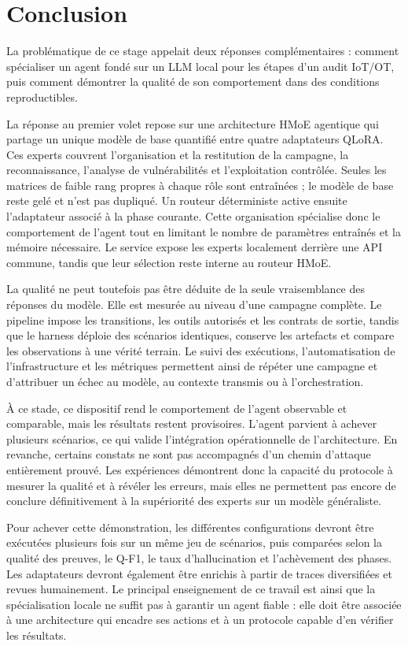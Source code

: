 \chapter{Conclusion}
\label{chap:conclusion}

La problématique de ce stage appelait deux réponses complémentaires : comment
spécialiser un agent fondé sur un LLM local pour les étapes d'un audit IoT/OT,
puis comment démontrer la qualité de son comportement dans des conditions
reproductibles.

La réponse au premier volet repose sur une architecture HMoE agentique qui
partage un unique modèle de base quantifié entre quatre adaptateurs QLoRA. Ces
experts couvrent l'organisation et la restitution de la campagne, la
reconnaissance, l'analyse de vulnérabilités et l'exploitation contrôlée. Seules
les matrices de faible rang propres à chaque rôle sont entraînées ; le modèle de
base reste gelé et n'est pas dupliqué. Un routeur déterministe active ensuite
l'adaptateur associé à la phase courante. Cette organisation spécialise donc le
comportement de l'agent tout en limitant le nombre de paramètres entraînés et la
mémoire nécessaire. Le service expose les experts localement derrière une API
commune, tandis que leur sélection reste interne au routeur HMoE.

La qualité ne peut toutefois pas être déduite de la seule vraisemblance des
réponses du modèle. Elle est mesurée au niveau d'une campagne complète. Le
pipeline impose les transitions, les outils autorisés et les contrats de sortie,
tandis que le harness déploie des scénarios identiques, conserve les artefacts et
compare les observations à une vérité terrain. Le suivi des exécutions,
l'automatisation de l'infrastructure et les métriques permettent ainsi de répéter
une campagne et d'attribuer un échec au modèle, au contexte transmis ou à
l'orchestration.

À ce stade, ce dispositif rend le comportement de l'agent observable et
comparable, mais les résultats restent provisoires. L'agent parvient à achever
plusieurs scénarios, ce qui valide l'intégration opérationnelle de l'architecture.
En revanche, certains constats ne sont pas accompagnés d'un chemin d'attaque
entièrement prouvé. Les expériences démontrent donc la capacité du protocole à
mesurer la qualité et à révéler les erreurs, mais elles ne permettent pas encore
de conclure définitivement à la supériorité des experts sur un modèle
généraliste.

Pour achever cette démonstration, les différentes configurations devront être
exécutées plusieurs fois sur un même jeu de scénarios, puis comparées selon la
qualité des preuves, le Q-F1, le taux d'hallucination et l'achèvement des phases.
Les adaptateurs devront également être enrichis à partir de traces diversifiées
et revues humainement. Le principal enseignement de ce travail est ainsi que la
spécialisation locale ne suffit pas à garantir un agent fiable : elle doit être
associée à une architecture qui encadre ses actions et à un protocole capable
d'en vérifier les résultats.


